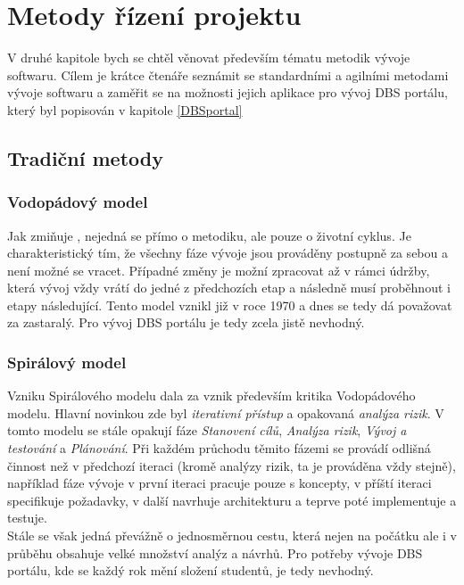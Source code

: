 \chapter{Metody řízení projektu} \label{methods}

V druhé kapitole bych se chtěl věnovat především tématu metodik vývoje softwaru. Cílem je krátce čtenáře seznámit se standardními a agilními metodami vývoje softwaru a zaměřit se na možnosti jejich aplikace pro vývoj DBS portálu, který byl popisován v kapitole \ref{DBSportal}

\section{Tradiční metody} \label{methods:traditional}

\subsection{Vodopádový model} \label{methods:waterfall}

Jak zmiňuje \cite{kadlec}, nejedná se přímo o metodiku, ale pouze o životní cyklus. Je charakteristický tím, že všechny fáze vývoje jsou prováděny postupně za sebou a není možné se vracet. Případné změny je možní zpracovat až v rámci údržby, která vývoj vždy vrátí do jedné z předchozích etap a následně musí proběhnout i etapy následující.
Tento model vznikl již v roce 1970 a dnes se tedy dá považovat za zastaralý. Pro vývoj DBS portálu je tedy zcela jistě nevhodný.

\subsection{Spirálový model} \label{methods:spiral}

Vzniku Spirálového modelu dala za vznik především kritika Vodopádového modelu. Hlavní novinkou zde byl \emph{iterativní přístup} a opakovaná \emph{analýza rizik}. V tomto modelu se stále opakují fáze \emph{Stanovení cílů}, \emph{Analýza rizik}, \emph{Vývoj a testování} a \emph{Plánování}. Při každém průchodu těmito fázemi se provádí odlišná činnost než v předchozí iteraci (kromě analýzy rizik, ta je prováděna vždy stejně), například fáze vývoje v první iteraci pracuje pouze s koncepty, v příští iteraci specifikuje požadavky, v další navrhuje architekturu a teprve poté implementuje a testuje.\\
Stále se však jedná převážně o jednosměrnou cestu, která nejen na počátku ale i v průběhu obsahuje velké množství analýz a návrhů. Pro potřeby vývoje DBS portálu, kde se každý rok mění složení studentů, je tedy nevhodný.

